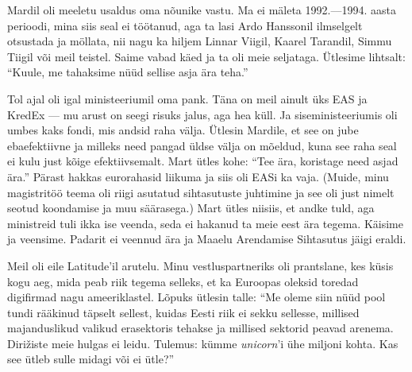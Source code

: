 
Mardil oli meeletu usaldus oma nõunike vastu. Ma ei mäleta 1992.---1994. aasta 
perioodi, mina siis seal ei töötanud, aga ta lasi Ardo 
Hanssonil ilmselgelt otsustada ja möllata, nii nagu 
ka hiljem Linnar Viigil, Kaarel 
Tarandil, Simmu Tiigil 
või meil teistel. Saime vabad käed ja ta oli meie seljataga. Ütlesime lihtsalt: \enquote{Kuule, me tahaksime nüüd sellise asja ära 
teha.} 

Tol ajal oli igal ministeeriumil oma pank. Täna on meil 
ainult üks EAS ja KredEx --- mu arust on seegi risuks jalus, aga hea küll. 
Ja siseministeeriumis oli umbes kaks fondi, mis andsid raha 
välja. Ütlesin Mardile, et see on jube ebaefektiivne ja 
milleks need pangad üldse välja on mõeldud, kuna see raha 
seal ei kulu just kõige efektiivsemalt. Mart ütles kohe: \enquote{Tee ära, 
koristage need asjad ära.} Pärast hakkas eurorahasid liikuma ja siis oli 
EASi ka vaja. (Muide, minu magistritöö teema oli riigi asutatud 
sihtasutuste juhtimine ja see oli just nimelt seotud koondamise ja muu säärasega.) Mart ütles niisiis, et andke tuld, aga ministreid tuli ikka 
ise veenda, seda ei hakanud ta meie eest ära tegema. Käisime ja veensime. Padarit ei veennud ära ja Maaelu 
Arendamise Sihtasutus jäigi eraldi.


Meil oli eile Latitude'il arutelu. Minu vestluspartneriks oli prantslane, kes küsis 
kogu aeg, mida peab riik tegema selleks, et ka Euroopas oleksid toredad digifirmad nagu ameeriklastel. Lõpuks
ütlesin talle: \enquote{Me oleme siin nüüd pool tundi rääkinud täpselt sellest, 
kuidas Eesti riik ei sekku sellesse, millised majanduslikud valikud 
erasektoris tehakse ja millised sektorid peavad arenema. 
Dirižiste meie hulgas ei leidu. Tulemus: kümme
\emph{unicorn}'i ühe miljoni kohta. Kas see ütleb sulle midagi või ei ütle?} 

